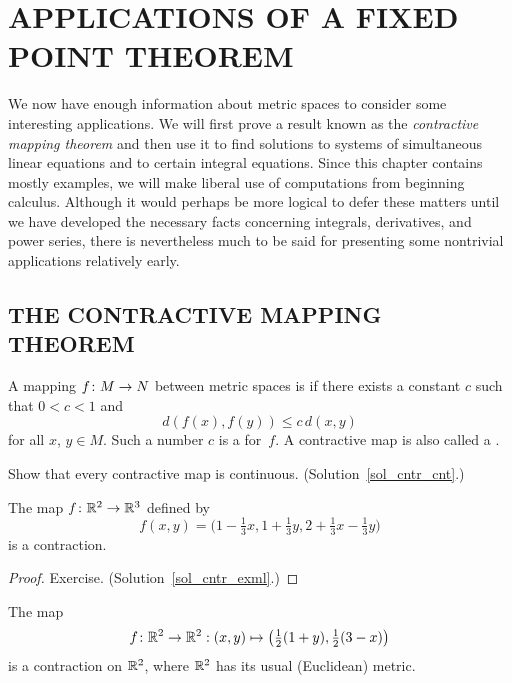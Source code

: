 \chapter{APPLICATIONS OF A FIXED POINT THEOREM}\label{fpt}

We now have enough information about metric spaces to consider some interesting applications.  We
will first prove a result known as the \emph{contractive mapping theorem} and then use it to find
solutions to systems of simultaneous linear equations and to certain integral equations.  Since
this chapter contains mostly examples, we will make liberal use of computations from beginning
calculus.  Although it would perhaps be more logical to defer these matters until we have developed
the necessary facts concerning integrals, derivatives, and power series, there is nevertheless much
to be said for presenting some nontrivial applications relatively early.



\section{THE CONTRACTIVE MAPPING THEOREM}
\begin{defn} A mapping $f \colon M \rightarrow N$ between metric spaces is
 if there exists a constant $c$ such that $0 < c < 1$ and
  \[ d(f(x),f(y))  \le  c\, d(x,y) \]
for all $x$, $y \in M$.  Such a number $c$ is a
 for~$f$.  A contractive map is also
called a
.
\end{defn}

\begin{exer}\label{cntr_cnt} Show that every contractive map is continuous.
(Solution~\ref{sol_cntr_cnt}.) \ns
\end{exer}

\begin{exam}\label{cntr_exm1} The map $f \colon \mathbb{R}^2 \rightarrow \mathbb{R}^3$ defined by
  \[ f(x,y) = \bigl(1 - \tfrac13x, 1 +\tfrac13y, 2 + \tfrac13x - \tfrac13y\bigr) \]
is a contraction.
\end{exam}

\begin{proof} Exercise. (Solution~\ref{sol_cntr_exml}.)   \ns  \end{proof}

\begin{exam} The map
  \[ f \colon \mathbb{R}^2 \rightarrow \mathbb{R}^2:(x,y) \mapsto \bigl(\tfrac12(1 + y), \tfrac12(3 - x)\bigr) \]
is a contraction on $\mathbb{R}^2$, where $\mathbb{R}^2$ has its usual (Euclidean) metric.
\end{exam}

